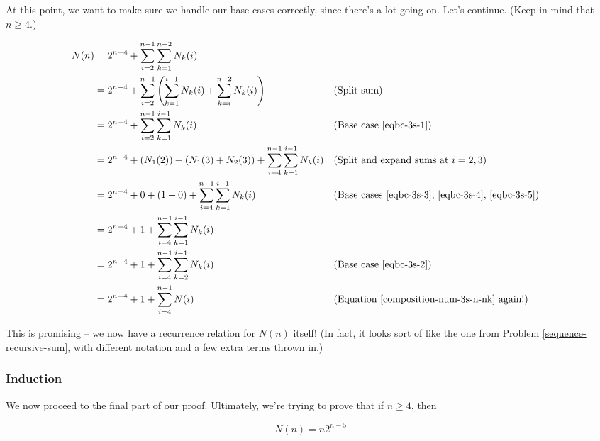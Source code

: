 
At this point, we want to make sure we handle our base cases correctly, since there's a lot going on. Let's continue. (Keep in mind that $n \geq 4$.)


\begin{align*}
N(n) &= 2^{n-4} + \sum_{i=2}^{n-1} \sum_{k=1}^{n-2} N_{k}(i) \\
&= 2^{n-4} + \sum_{i=2}^{n-1} \left( \sum_{k=1}^{i-1} N_{k}(i) + \sum_{k=i}^{n-2} N_{k}(i) \right) && \text{(Split sum)} \\
&= 2^{n-4} + \sum_{i=2}^{n-1} \sum_{k=1}^{i-1} N_{k}(i) && \text{(Base case \ref{eqbc-3s-1})} \\
&= 2^{n-4} + \left( N_1(2) \right) + \left( N_1(3) + N_2(3) \right) + \sum_{i=4}^{n-1} \sum_{k=1}^{i-1} N_{k}(i) && \text{(Split and expand sums at $i=2,3$)} \\
&= 2^{n-4} + 0 + \left( 1 + 0 \right) + \sum_{i=4}^{n-1} \sum_{k=1}^{i-1} N_{k}(i) && \text{(Base cases \ref{eqbc-3s-3}, \ref{eqbc-3s-4}, \ref{eqbc-3s-5})} \\
&= 2^{n-4} + 1 + \sum_{i=4}^{n-1} \sum_{k=1}^{i-1} N_{k}(i) \\
&= 2^{n-4} + 1 + \sum_{i=4}^{n-1} \sum_{k=2}^{i-1} N_{k}(i) && \text{(Base case \ref{eqbc-3s-2})} \\
&= 2^{n-4} + 1 + \sum_{i=4}^{n-1} N(i) && \text{(Equation \ref{composition-num-3s-n-nk} again!)} \\
\end{align*}

This is promising -- we now have a recurrence relation for $N(n)$ itself! (In fact, it looks sort of like the one from Problem \ref{sequence-recursive-sum}, with different notation and a few extra terms thrown in.)


\subsubsection{Induction}

We now proceed to the final part of our proof. Ultimately, we're trying to prove that if $n \geq 4$, then 

\begin{equation*}
N(n) = n2^{n-5}
\end{equation*}

